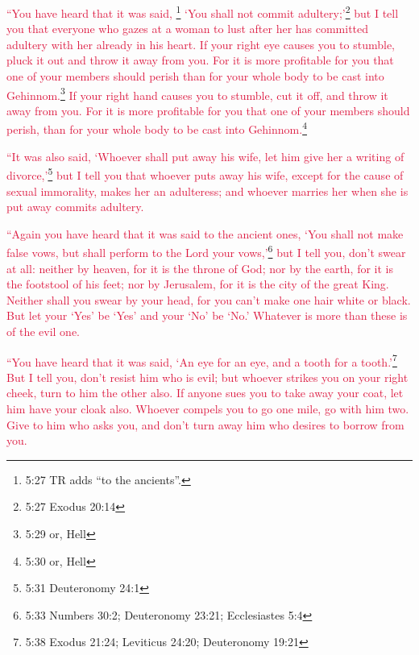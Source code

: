 \myverse{}\textcolor{crimson}{“You have heard that it was said,
}\footnote{5:27 TR adds “to the ancients”.}
\textcolor{crimson}{‘You shall not commit adultery;’}\footnote{5:27 Exodus 20:14}
\myverse{}\textcolor{crimson}{but I tell you that everyone who gazes at a woman to lust after her has
	committed adultery with her already in his heart.
}
\myverse{}\textcolor{crimson}{If your right eye causes you to stumble, pluck it out and throw it away
	from you. For it is more profitable for you that one of your members should perish than for your whole
	body to be cast into Gehinnom.}\footnote{5:29 or, Hell}
\myverse{}\textcolor{crimson}{If your right hand causes you to stumble, cut it off, and throw it away
	from you. For it is more profitable for you that one of your members should perish, than for your whole
	body to be cast into Gehinnom.}\footnote{5:30 or, Hell}

\myverse{}\textcolor{crimson}{“It was also said, ‘Whoever shall put away his wife, let
	him give her a writing of divorce,’}\footnote{5:31 Deuteronomy 24:1}
\myverse{}\textcolor{crimson}{but I tell you that whoever puts away his wife, except for the cause of
	sexual immorality, makes her an adulteress; and whoever marries her when she is put away commits adultery.}

\myverse{}\textcolor{crimson}{“Again you have heard that it was said to the ancient ones,
	‘You shall not make false vows, but shall perform to the Lord your vows,’}\footnote{5:33 Numbers 30:2;
	Deuteronomy 23:21;
	Ecclesiastes 5:4}
\myverse{}\textcolor{crimson}{but I tell you, don’t swear at all: neither by heaven, for it is the throne
	of God;
}
\myverse{}\textcolor{crimson}{nor by the earth, for it is the footstool of his feet; nor by Jerusalem,
	for it is the city of the great King.
}
\myverse{}\textcolor{crimson}{Neither shall you swear by your head, for you can’t make one hair white
	or black.
}
\myverse{}\textcolor{crimson}{But let your ‘Yes’ be ‘Yes’ and your ‘No’ be ‘No.’ Whatever is more than
	these is of the evil one.}

\myverse{}\textcolor{crimson}{“You have heard that it was said, ‘An eye for an eye, and
	a tooth for a tooth.’}\footnote{5:38 Exodus 21:24;
	Leviticus 24:20;
	Deuteronomy 19:21}
\myverse{}\textcolor{crimson}{But I tell you, don’t resist him who is evil; but whoever strikes you
	on your right cheek, turn to him the other also.
}
\myverse{}\textcolor{crimson}{If anyone sues you to take away your coat, let him have your cloak also.
}
\myverse{}\textcolor{crimson}{Whoever compels you to go one mile, go with him two.
}
\myverse{}\textcolor{crimson}{Give to him who asks you, and don’t turn away him who desires to borrow
	from you.}

